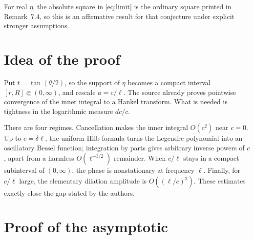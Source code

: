 \documentclass[11pt]{article}
\begin{document}
For real \(\eta\), the absolute square in \eqref{eq:limit} is the ordinary
square printed in Remark~7.4, so this is an affirmative result for that
conjecture under explicit stronger assumptions.

\section{Idea of the proof}

Put \(t=\tan(\theta/2)\), so the support of \(\eta\) becomes a compact interval
\([r,R]\Subset(0,\infty)\), and rescale \(a=c/\ell\).  The source already proves
pointwise convergence of the inner integral to a Hankel transform.  What is
needed is tightness in the logarithmic measure \(dc/c\).

There are four regimes.  Cancellation makes the inner integral \(O(c^2)\)
near \(c=0\).  Up to \(c=\delta\ell\), the uniform Hilb formula turns the
Legendre polynomial into an oscillatory Bessel function; integration by parts
gives arbitrary inverse powers of \(c\), apart from a harmless
\(O(\ell^{-3/2})\) remainder.  When \(c/\ell\) stays in a compact subinterval
of \((0,\infty)\), the phase is nonstationary at frequency \(\ell\).  Finally,
for \(c/\ell\) large, the elementary dilation amplitude is \(O((\ell/c)^2)\).
These estimates exactly close the gap stated by the authors.

\section{Proof of the asymptotic}
\end{document}
